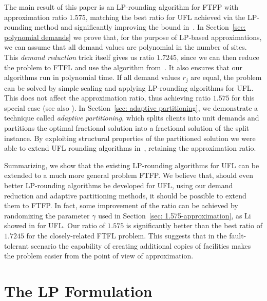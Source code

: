 \documentclass{llncs}
\begin{document}
\smallskip

The main result of this paper is an LP-rounding algorithm for FTFP
with approximation ratio 1.575, matching the best ratio for UFL
achieved via the LP-rounding method \cite{ByrkaGS10} and significantly
improving the bound in~\cite{YanC11}. In Section~\ref{sec: polynomial
  demands} we prove that, for the purpose of LP-based approximations,
we can assume that all demand values are polynomial in the number of
sites. This \emph{demand reduction} trick itself gives us ratio
$1.7245$, since we can then reduce the problem to
FTFL and use the algorithm from~\cite{ByrkaSS10}. It also ensures
that our algorithms run in polynomial time. If all demand values $r_j$
are equal, the problem can be solved by simple scaling and applying
LP-rounding algorithms for UFL. This does not affect the approximation
ratio, thus achieving ratio $1.575$ for this special case (see also
\cite{LiaoShen11}). In Section~\ref{sec: adaptive partitioning}, we
demonstrate a technique called \emph{adaptive partitioning}, which
splits clients into unit demands and partitions the optimal fractional
solution into a fractional solution of the split instance. By
exploiting structural properties of the partitioned solution we were
able to extend UFL rounding algorithms
in~\cite{gupta08,ChudakS04,ByrkaGS10}, retaining the approximation
ratio.

Summarizing, we show that the existing LP-rounding
algorithms for UFL can be extended to a much more general
problem FTFP. We believe
that, should even better LP-rounding algorithms be developed
for UFL, using our demand reduction and
adaptive partitioning methods, it should be possible to
extend them to FTFP.  In fact, some improvement of the ratio
can be achieved by randomizing the parameter
$\gamma$ used in Section~\ref{sec: 1.575-approximation}, as Li showed in \cite{Li11}
for UFL.  Our ratio of $1.575$ is significantly better
than the best ratio of $1.7245$ for the closely-related FTFL
problem. This suggests that in the fault-tolerant scenario
the capability of creating additional copies of facilities
makes the problem easier from the point of view of
approximation.


\section{The LP Formulation}\label{sec: the lp formulation}
\end{document}

